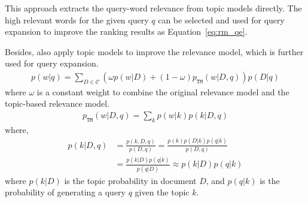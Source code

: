 This approach extracts the query-word relevance from topic models directly. The high relevant words for the given query $q$ can be selected and used for query expansion to improve the ranking results as Equation~\ref{eq:rm_qe}.

Besides, \cite{Yi-2009} also apply topic models to improve the relevance model, which is further used for query expansion. 
\begin{align}
p(w|q) = \sum_{D \in \mathcal{C}} (\omega p(w|D) + (1 - \omega)p_{\texttt{TM}}(w|D,q))p(D|q)
\end{align}
where $\omega$ is a constant weight to combine the original relevance model and the topic-based relevance model. 
\begin{align}
p_{\texttt{TM}}(w|D,q) = \sum_k p(w|k) p(k|D,q)
\end{align}
where,
\begin{align}
p(k|D,q) &= \frac{p(k,D,q)}{p(D,q)}  = \frac{p(k)p(D|k)p(q|k)}{p(D,q)} \\
&= \frac{p(k|D)p(q|k)}{p(q|D)} \approx p(k|D)p(q|k)
\end{align}
where $p(k|D)$ is the topic probability in document $D$, and $p(q|k)$ is the probability of generating a query $q$ given the topic $k$. 

